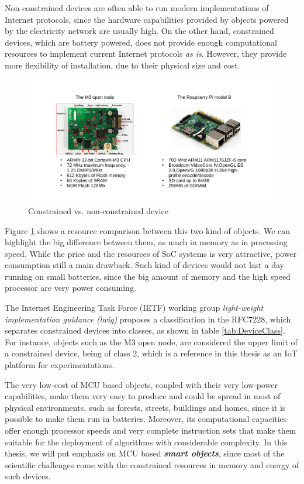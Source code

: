 Non-constrained devices are often able to run modern implementations of Internet protocols, since the hardware capabilities provided by objects powered by the electricity network are usually high.
On the other hand, constrained devices, which are battery powered, does not provide enough computational resources to implement current Internet protocols \textit{as is}.
However, they provide more flexibility of installation, due to their physical size and cost.

\begin{figure}[htb]
	\centering
	\includegraphics[width=1\columnwidth]{chapters/background.images/BoardsComparison.pdf}
	\caption{Constrained vs. non-constrained device}
	\label{fig:BoardsComparison}
\end{figure}

Figure \ref{fig:BoardsComparison} shows a resource comparison between this two kind of objects.
We can highlight the big difference between them, as much in memory as in processing speed.
While the price and the resources of SoC systems is very attractive, power consumption still a main drawback.
Such kind of devices would not last a day running on small batteries, since the big amount of memory and the high speed processor are very power consuming.

The Internet Engineering Task Force (IETF) working group \textit{light-weight implementation guidance (lwig)} proposes a classification in the RFC7228\cite{rfc7228}, which separates constrained devices into classes, as shown in table \ref{tab:DeviceClass}.
For instance, objects such as the M3 open node\cite{iotlab-m3}, are considered the upper limit of a constrained device, being of class 2, which is a reference in this thesis as an IoT platform for experimentations.

The very low-cost of MCU based objects, coupled with their very low-power capabilities, make them very easy to produce and could be spread in most of physical environments, such as forests, streets, buildings and homes, since it is possible to make them run in batteries.
Moreover, its computational capacities offer enough processor speeds and very complete instruction sets that make them suitable for the deployment of algorithms with considerable complexity.
In this thesis, we will put emphasis on MCU based \textit{\textbf{smart objects}}\cite{kortuem2010smart}, since most of the scientific challenges come with the constrained resources in memory and energy of such devices.

